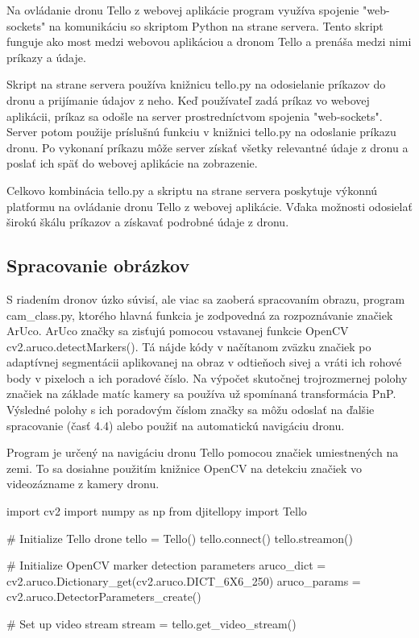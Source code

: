 Na ovládanie dronu Tello z webovej aplikácie program využíva spojenie "web-sockets" na komunikáciu so skriptom Python na strane servera. Tento skript funguje ako most medzi webovou aplikáciou a dronom Tello a prenáša medzi nimi príkazy a údaje.

Skript na strane servera používa knižnicu tello.py na odosielanie príkazov do dronu a prijímanie údajov z neho. Keď používateľ zadá príkaz vo webovej aplikácii, príkaz sa odošle na server prostredníctvom spojenia "web-sockets". Server potom použije príslušnú funkciu v knižnici tello.py na odoslanie príkazu dronu. Po vykonaní príkazu môže server získať všetky relevantné údaje z dronu a poslať ich späť do webovej aplikácie na zobrazenie.

Celkovo kombinácia tello.py a skriptu na strane servera poskytuje výkonnú platformu na ovládanie dronu Tello z webovej aplikácie. Vďaka možnosti odosielať širokú škálu príkazov a získavať podrobné údaje z dronu.

\subsection{Spracovanie obrázkov}
S riadením dronov úzko súvisí, ale viac sa zaoberá spracovaním obrazu, program cam\_class.py, ktorého hlavná funkcia je zodpovedná za rozpoznávanie značiek ArUco. ArUco značky sa zisťujú pomocou vstavanej funkcie OpenCV cv2.aruco.detectMarkers(). Tá nájde kódy v načítanom zväzku značiek po adaptívnej segmentácii aplikovanej na obraz v odtieňoch sivej a vráti ich rohové body v pixeloch a ich poradové číslo. Na výpočet skutočnej trojrozmernej polohy značiek na základe matíc kamery sa používa už spomínaná transformácia PnP. Výsledné polohy s ich poradovým číslom značky sa môžu odoslať na ďalšie spracovanie (časť 4.4) alebo použiť na automatickú navigáciu dronu.

Program je určený na navigáciu dronu Tello pomocou značiek umiestnených na zemi. To sa dosiahne použitím knižnice OpenCV na detekciu značiek vo videozázname z kamery dronu.
\begin{mypython}[caption={Inicializácia parametrov detekcie značiek OpenCV},label=CL-3]

    import cv2
    import numpy as np
    from djitellopy import Tello
    
    # Initialize Tello drone
    tello = Tello()
    tello.connect()
    tello.streamon()
    
    # Initialize OpenCV marker detection parameters
    aruco_dict = cv2.aruco.Dictionary_get(cv2.aruco.DICT_6X6_250)
    aruco_params = cv2.aruco.DetectorParameters_create()
    
    # Set up video stream
    stream = tello.get_video_stream()
\end{mypython}

